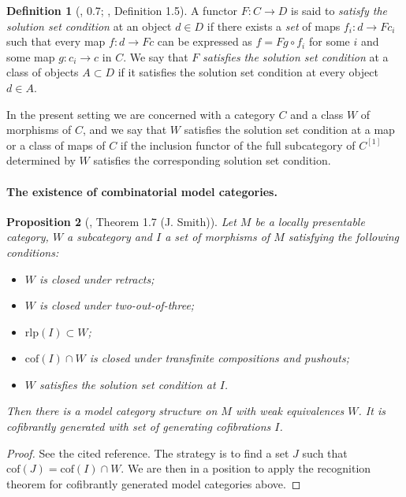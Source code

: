 \documentclass{article}
\theoremstyle{definition}
\newtheorem{definition}{Definition}[section]
\theoremstyle{plain}
\newtheorem{prop}[definition]{Proposition}
\newcommand{\cof}{\mathrm{cof}}
\newcommand{\rlp}{\mathrm{rlp}}
\begin{document}
\begin{definition}[\cite{AR}, 0.7; \cite{B}, Definition 1.5]
  A functor $F : C \to D$ is said to \emph{satisfy the solution set condition} at an object $d \in D$ if there exists a \emph{set} of maps $f_i : d \to Fc_i$ such that every map $f : d \to Fc$ can be expressed as $f = Fg \circ f_i$ for some $i$ and some map $g : c_i \to c$ in $C$.
  We say that $F$ \emph{satisfies the solution set condition} at a class of objects $A \subset D$ if it satisfies the solution set condition at every object $d \in A$.

  In the present setting we are concerned with a category $C$ and a class $W$ of morphisms of $C$, and we say that $W$ satisfies the solution set condition at a map or a class of maps of $C$ if the inclusion functor of the full subcategory of $C^{[1]}$ determined by $W$ satisfies the corresponding solution set condition.
\end{definition}

\paragraph{The existence of combinatorial model categories.}

\begin{prop}[\cite{B}, Theorem 1.7 (J. Smith)]
  Let $M$ be a locally presentable category, $W$ a subcategory and $I$ a set of morphisms of $M$ satisfying the following conditions:
  \begin{itemize}
  \item $W$ is closed under retracts;
  \item $W$ is closed under two-out-of-three;
  \item $\rlp(I) \subset W$;
  \item $\cof(I) \cap W$ is closed under transfinite compositions and pushouts;
  \item $W$ satisfies the solution set condition at $I$.
  \end{itemize}
  Then there is a model category structure on $M$ with weak equivalences $W$.
  It is cofibrantly generated with set of generating cofibrations $I$.
\end{prop}

\begin{proof}
  See the cited reference.
  The strategy is to find a set $J$ such that $\cof(J) = \cof(I) \cap W$.
  We are then in a position to apply the recognition theorem for cofibrantly generated model categories above.
\end{proof}
\end{document}
